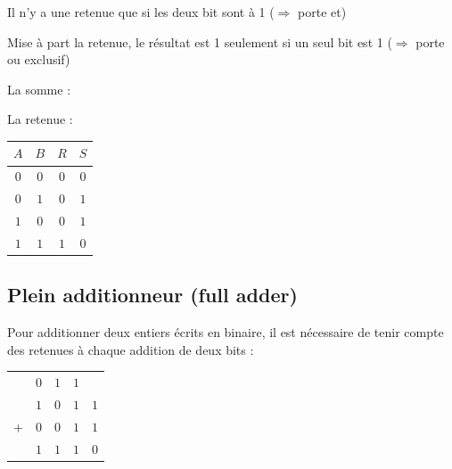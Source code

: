 Il n'y a une retenue que si les deux bit sont à 1 ($\Rightarrow$ porte et)

Mise à part la retenue, le résultat est 1 seulement si un seul bit est 1 ($\Rightarrow$ porte ou exclusif)

\begin{center}
\begin{multicols}{3}

La somme :


\smallskip

La retenue :


\begin{tabular}{cc|c|c}
$A$ & $B$ & $R$ & $S$ \\
\hline
$0$ & $0$ & $0$ & $0$ \\
$0$ & $1$ & $0$ & $1$\\
$1$ & $0$ & $0$ & $1$ \\
$1$ & $1$ & $1$ & $0$\\
\end{tabular}
\end{multicols}
\end{center}

\subsection{Plein additionneur (full adder)}

Pour additionner deux entiers écrits en binaire, il est nécessaire de tenir compte des retenues à chaque addition de deux bits :

\begin{center}
\begin{tabular}{ccccc}
    & {\scriptsize$0$} & {\scriptsize$1$} & {\scriptsize$1$} &   \\
    & $1$ & $0$ & $1$ & $1$ \\
$+$ & $0$ & $0$ & $1$ & $1$ \\
\hline
    & $1$ & $1$ & $1$ & $0$\\
\end{tabular}
\end{center}

